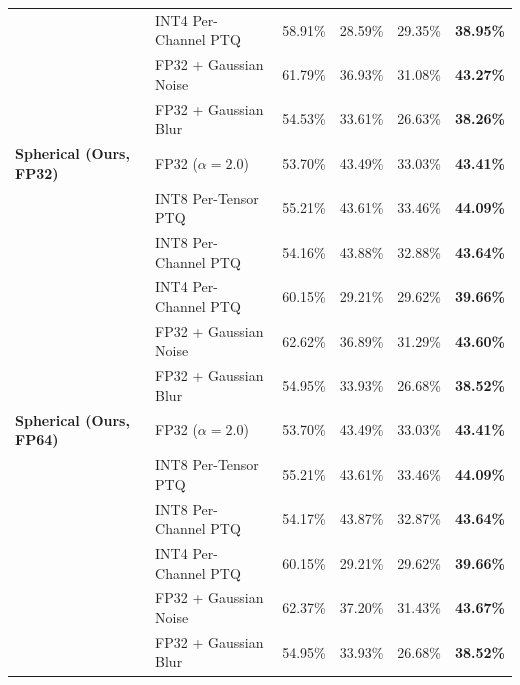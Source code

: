 \documentclass{article}
\theoremstyle{plain}
\theoremstyle{definition}
\theoremstyle{remark}
\begin{document}
\begin{table}[h]
\begin{center}
\begin{small}
\begin{tabular}{llcccc}
& INT4 Per-Channel PTQ & 58.91\% & 28.59\% & 29.35\% & \textbf{38.95\%} \\
& FP32 + Gaussian Noise & 61.79\% & 36.93\% & 31.08\% & \textbf{43.27\%} \\
& FP32 + Gaussian Blur & 54.53\% & 33.61\% & 26.63\% & \textbf{38.26\%} \\
\midrule
\textbf{Spherical (Ours, FP32)} & FP32 ($\alpha = 2.0$) & 53.70\% & 43.49\% & 33.03\% & \textbf{43.41\%} \\
& INT8 Per-Tensor PTQ & 55.21\% & 43.61\% & 33.46\% & \textbf{44.09\%} \\
& INT8 Per-Channel PTQ & 54.16\% & 43.88\% & 32.88\% & \textbf{43.64\%} \\
& INT4 Per-Channel PTQ & 60.15\% & 29.21\% & 29.62\% & \textbf{39.66\%} \\
& FP32 + Gaussian Noise & 62.62\% & 36.89\% & 31.29\% & \textbf{43.60\%} \\
& FP32 + Gaussian Blur & 54.95\% & 33.93\% & 26.68\% & \textbf{38.52\%} \\
\midrule
\textbf{Spherical (Ours, FP64)} & FP32 ($\alpha = 2.0$) & 53.70\% & 43.49\% & 33.03\% & \textbf{43.41\%} \\
& INT8 Per-Tensor PTQ & 55.21\% & 43.61\% & 33.46\% & \textbf{44.09\%} \\
& INT8 Per-Channel PTQ & 54.17\% & 43.87\% & 32.87\% & \textbf{43.64\%} \\
& INT4 Per-Channel PTQ & 60.15\% & 29.21\% & 29.62\% & \textbf{39.66\%} \\
& FP32 + Gaussian Noise & 62.37\% & 37.20\% & 31.43\% & \textbf{43.67\%} \\
& FP32 + Gaussian Blur & 54.95\% & 33.93\% & 26.68\% & \textbf{38.52\%} \\
\bottomrule
\end{tabular}
\end{small}
\end{center}
\vskip -0.1in
\end{table}
\end{document}
